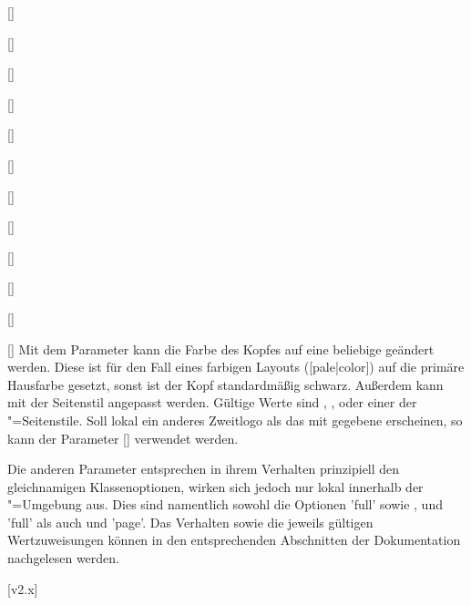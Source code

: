 \begin{Declaration}{[]}
\begin{Declaration}{[]}
\begin{Declaration}{[]}
\begin{Declaration}{[]}
\begin{Declaration}[v2.02]{[\PSet]}
\begin{Declaration}{[]}
\begin{Declaration}[v2.02]{[\PSet]}
\begin{Declaration}[v2.02]{[\PSet]}
\begin{Declaration}[v2.02]{[\PSet]}
\begin{Declaration}{[\PSet]}
\begin{Declaration}[v2.02]{[\PSet]}
\begin{Declaration}{[\PBoolean]}
Mit dem Parameter  kann die Farbe des Kopfes 
auf eine beliebige geändert werden. Diese ist für den Fall eines farbigen 
Layouts ([pale|color]) auf die primäre Hausfarbe  
gesetzt, sonst ist der Kopf standardmäßig schwarz. Außerdem kann mit
 der Seitenstil angepasst werden. 
Gültige Werte sind , ,  oder einer 
der "=Seitenstile. Soll lokal ein anderes Zweitlogo als 
das mit  gegebene erscheinen, so kann der Parameter 
[] verwendet werden.

Die anderen Parameter entsprechen in ihrem Verhalten prinzipiell den 
gleichnamigen Klassenoptionen, wirken sich jedoch nur lokal innerhalb der 
"=Umgebung aus. Dies sind namentlich sowohl die Optionen 
'full' sowie ,  und 
'full' als auch  und 'page'. 
Das Verhalten sowie die jeweils gültigen Wertzuweisungen können in den 
entsprechenden Abschnitten der Dokumentation nachgelesen werden.
\end{Declaration}
\end{Declaration}
\end{Declaration}
\end{Declaration}
\end{Declaration}
\end{Declaration}
\end{Declaration}
\end{Declaration}
\end{Declaration}
\end{Declaration}
\end{Declaration}
\end{Declaration}

[v2.x]


